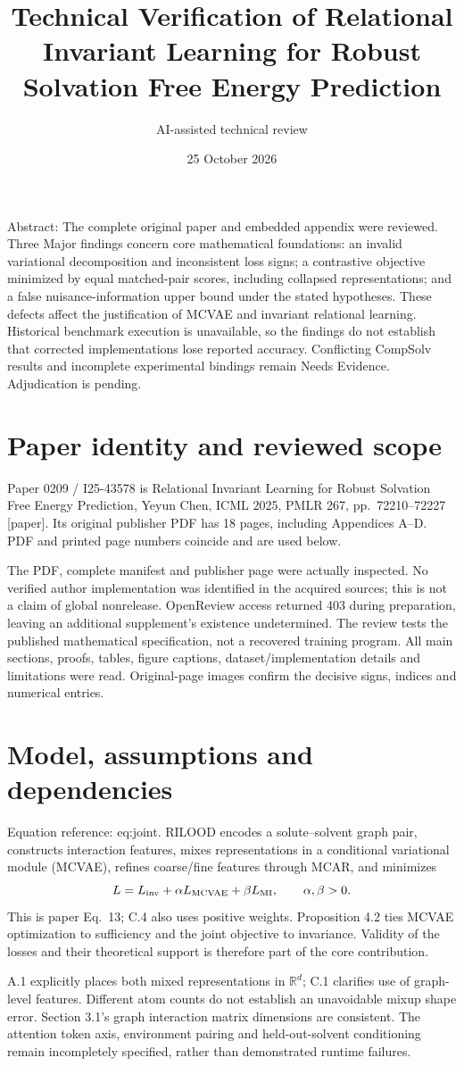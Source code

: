 \documentclass[10pt]{article}
\title{Technical Verification of Relational Invariant Learning for Robust Solvation Free Energy Prediction}
\author{AI-assisted technical review}
\date{25 October 2026}
\begin{document}
\maketitle
Abstract: The complete original paper and embedded appendix were reviewed. Three Major findings concern core mathematical foundations: an invalid variational decomposition and inconsistent loss signs; a contrastive objective minimized by equal matched-pair scores, including collapsed representations; and a false nuisance-information upper bound under the stated hypotheses. These defects affect the justification of MCVAE and invariant relational learning. Historical benchmark execution is unavailable, so the findings do not establish that corrected implementations lose reported accuracy. Conflicting CompSolv results and incomplete experimental bindings remain Needs Evidence. Adjudication is pending.\par
\section*{Paper identity and reviewed scope}
Paper 0209 / I25-43578 is Relational Invariant Learning for Robust Solvation Free Energy Prediction, Yeyun Chen, ICML 2025, PMLR 267, pp. 72210–72227 [paper]. Its original publisher PDF has 18 pages, including Appendices A–D. PDF and printed page numbers coincide and are used below.\par
The PDF, complete manifest and publisher page were actually inspected. No verified author implementation was identified in the acquired sources; this is not a claim of global nonrelease. OpenReview access returned 403 during preparation, leaving an additional supplement’s existence undetermined. The review tests the published mathematical specification, not a recovered training program. All main sections, proofs, tables, figure captions, dataset/implementation details and limitations were read. Original-page images confirm the decisive signs, indices and numerical entries.\par
\section*{Model, assumptions and dependencies}
Equation reference: eq:joint. RILOOD encodes a solute–solvent graph pair, constructs interaction features, mixes representations in a conditional variational module (MCVAE), refines coarse/fine features through MCAR, and minimizes \[
 L=L_{\rm inv}+\alpha L_{\rm MCVAE}+\beta L_{\rm MI},
 \qquad \alpha,\beta>0.\] This is paper Eq. 13; C.4 also uses positive weights. Proposition 4.2 ties MCVAE optimization to sufficiency and the joint objective to invariance. Validity of the losses and their theoretical support is therefore part of the core contribution.\par
A.1 explicitly places both mixed representations in \(\mathbb R^d\); C.1 clarifies use of graph-level features. Different atom counts do not establish an unavoidable mixup shape error. Section 3.1’s graph interaction matrix dimensions are consistent. The attention token axis, environment pairing and held-out-solvent conditioning remain incompletely specified, rather than demonstrated runtime failures.\par
\end{document}
